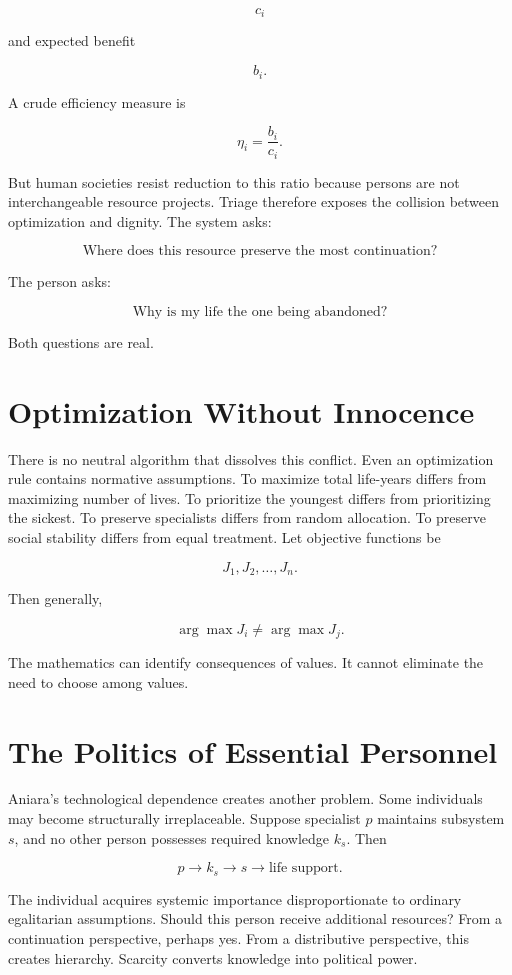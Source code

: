 \documentclass[11pt,oneside]{book}
\theoremstyle{definition}
\theoremstyle{remark}
\begin{document}
\[
c_i
\]

and expected benefit

\[
b_i.
\]

A crude efficiency measure is

\[
\eta_i = \frac{b_i}{c_i}.
\]

But human societies resist reduction to this ratio because persons are not interchangeable resource
projects. Triage therefore exposes the collision between optimization and dignity. The system asks:

\[
\text{Where does this resource preserve the most continuation?}
\]

The person asks:

\[
\text{Why is my life the one being abandoned?}
\]

Both questions are real.

\section{Optimization Without Innocence}

There is no neutral algorithm that dissolves this conflict. Even an optimization rule contains
normative assumptions. To maximize total life-years differs from maximizing number of lives. To
prioritize the youngest differs from prioritizing the sickest. To preserve specialists differs from
random allocation. To preserve social stability differs from equal treatment. Let objective
functions be

\[
J_1,J_2,\ldots,J_n.
\]

Then generally,

\[
\arg\max J_i \neq \arg\max J_j.
\]

The mathematics can identify consequences of values. It cannot eliminate the need to choose among
values.

\section{The Politics of Essential Personnel}

Aniara's technological dependence creates another problem. Some individuals may become structurally
irreplaceable. Suppose specialist \(p\) maintains subsystem \(s\), and no other person possesses
required knowledge \(k_s\). Then

\[
p\rightarrow k_s\rightarrow s\rightarrow \text{life support}.
\]

The individual acquires systemic importance disproportionate to ordinary egalitarian assumptions.
Should this person receive additional resources? From a continuation perspective, perhaps yes. From
a distributive perspective, this creates hierarchy. Scarcity converts knowledge into political
power.
\end{document}
